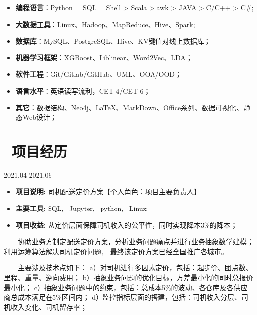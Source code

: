 \documentclass{resume}
\begin{document}
\begin{itemize}  [parsep=0.5ex]

   \item   \textbf{编程语言}：Python = SQL = Shell > Scala > awk > JAVA > C/C++ > C\#;
   \item    \textbf{大数据工具}：Linux、Hadoop、MapReduce、Hive、Spark;
   \item    \textbf{数据库}：MySQL、PostgreSQL、Hive、KV键值对线上数据库；
   \item    \textbf{机器学习框架}：XGBoost、Liblinear、Word2Vec、LDA；
   \item    \textbf{软件工程}：Git/Gitlab/GitHub、UML、OOA/OOD；
   \item    \textbf{语言水平}：英语读写流利，CET-4/CET-6；
   \item    \textbf{其它}：数据结构、Neo4j、LaTeX、MarkDown、Office系列、数据可视化、静态Web设计；
 
\end{itemize}

\medskip










\section{   \faUsers    \ 项目经历}





                      {2021.04-2021.09}

\begin{itemize}  [parsep=0.5ex]

  \item   \textbf{  项目说明:  }   {  司机配送定价方案【个人角色：项目主要负责人】  } 
  \item   \textbf{  主要工具:  }   {  SQL, \ Jupyter, \ python, \ Linux }
  \item   \textbf{  项目收益:  }   { 从定价层面保障司机收入的公平性，同时实现降本3\%的降本； }

\end{itemize}


{    \ \ \ \ 协助业务方制定配送定价方案，分析业务问题痛点并进行业务抽象数学建模；利用运筹算法解决司机定价问题，
最终该定价方案已经全国推广各城市。

\ \ \ \ 主要涉及技术点如下：
a）对司机进行多因素定价，包括：起步价、团点数、里程、重量、逆向费用；
b）抽象业务问题的优化目标，方差最小化的同时总报价最小化；
c）抽象业务问题中的约束，包括：总成本5\%的波动、各仓库及各供应商总成本满足在5\%区间内；
d）监控指标层面的搭建，包括：司机收入分层、司机收入变化、司机留存率；
}
\end{document}
